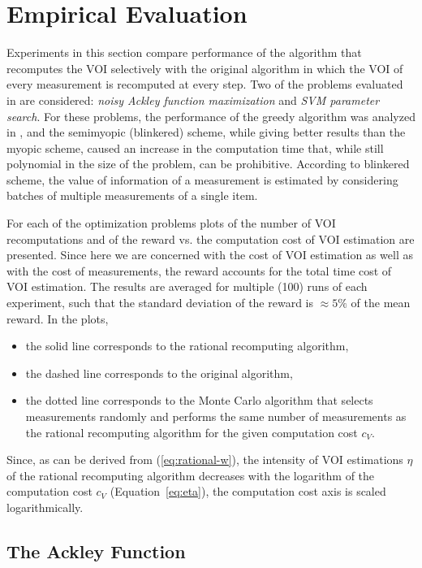 \section{ Empirical Evaluation}
\label{sec:raticomp-empirical}

Experiments in this section compare performance of the algorithm that
recomputes the VOI selectively with the original algorithm in which
the VOI of every measurement is recomputed at every step.  Two of the
problems evaluated in \cite{TolpinShimony.blinkered} are considered:
{\it noisy Ackley function maximization} and {\it SVM parameter
search}.  For these problems, the performance of the greedy algorithm
was analyzed in \cite{TolpinShimony.blinkered}, and the semimyopic
(blinkered) scheme, while giving better results than the myopic
scheme, caused an increase in the computation time that, while still
polynomial in the size of the problem, can be prohibitive. According
to blinkered scheme, the value of information of a measurement is
estimated by considering batches of multiple measurements of a single
item. 

For each of the optimization problems plots of the number of VOI
recomputations and of the reward vs. the computation cost of VOI
estimation are presented. 
Since here we are concerned with the cost of VOI estimation as
well as with the cost of measurements, the reward accounts for the
total time cost of VOI estimation.  The results are averaged for multiple
(100) runs of each experiment, such that the standard deviation of the
reward is $\approx 5\%$ of the mean reward. In the plots, 
\begin{itemize}
\item the solid line corresponds to the rational recomputing
  algorithm,
\item the dashed line corresponds to the original algorithm,
\item the dotted line corresponds to the Monte Carlo algorithm that
  selects measurements randomly and performs the same number of
  measurements as the rational recomputing algorithm for the given
  computation cost $c_V$. 
\end{itemize}
Since, as can be derived from (\ref{eq:rational-w}), the intensity of VOI
estimations $\eta$ of the rational recomputing algorithm decreases with
the logarithm of the computation cost $c_V$ (Equation~\ref{eq:eta}),
the computation cost axis is scaled logarithmically.

\subsection{The Ackley Function}


